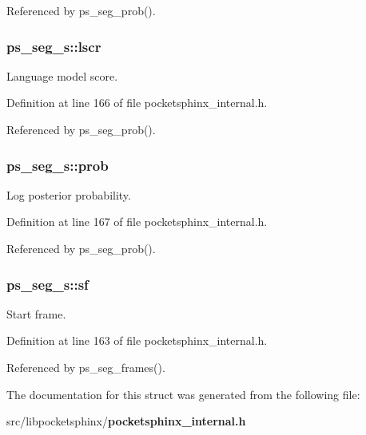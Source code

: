 \-Referenced by ps\-\_\-seg\-\_\-prob().

\subsubsection[{lscr}]{ {\bf ps\-\_\-seg\-\_\-s\-::lscr}}\label{structps__seg__s_a69e605f422eeed1a9c67437e8ddd8b08}


\-Language model score. 



\-Definition at line 166 of file pocketsphinx\-\_\-internal.\-h.



\-Referenced by ps\-\_\-seg\-\_\-prob().

\subsubsection[{prob}]{ {\bf ps\-\_\-seg\-\_\-s\-::prob}}\label{structps__seg__s_ae683244d90d0a5339930b47757778432}


\-Log posterior probability. 



\-Definition at line 167 of file pocketsphinx\-\_\-internal.\-h.



\-Referenced by ps\-\_\-seg\-\_\-prob().

\subsubsection[{sf}]{ {\bf ps\-\_\-seg\-\_\-s\-::sf}}\label{structps__seg__s_a885a599726cd0efba573d106d016e6e2}


\-Start frame. 



\-Definition at line 163 of file pocketsphinx\-\_\-internal.\-h.



\-Referenced by ps\-\_\-seg\-\_\-frames().



\-The documentation for this struct was generated from the following file\-:\begin{DoxyCompactItemize}
\item 
src/libpocketsphinx/{\bf pocketsphinx\-\_\-internal.\-h}\end{DoxyCompactItemize}
